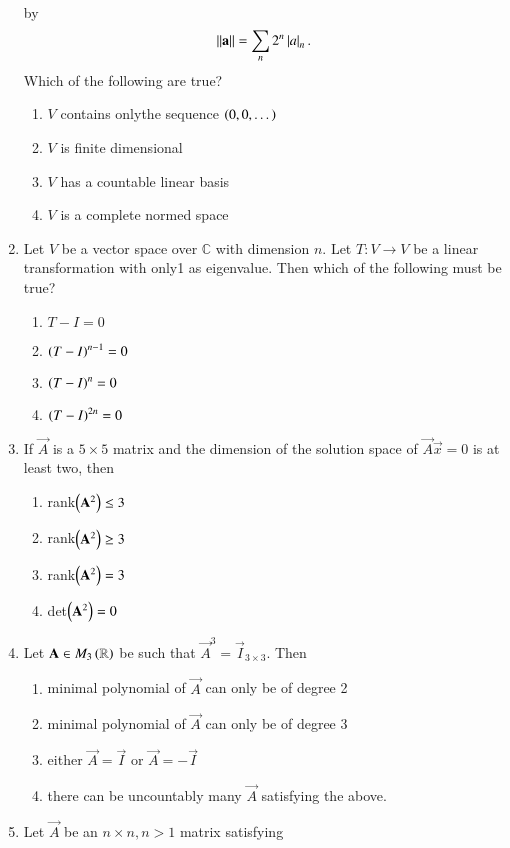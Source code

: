 \begin{enumerate}[label=\thesection.\arabic*.,ref=\thesection.\theenumi]
\begin{align}
\end{align}
by
\begin{align}
\left\lVert\mathbf{a}\right\rVert = \sum_{n}2^n\left\vert a\right\vert_n.
\end{align}
%
Which of the following are true?
\begin{enumerate}
\item $V$ contains onlythe sequence $\left(0,0,\dots\right)$
\item $V$ is finite dimensional
\item $V$ has a countable linear basis
\item $V$ is a complete normed space
\end{enumerate}
%
\item Let $V$ be a vector space over $\mathbb{C}$ with dimension $n$.  Let $T:V\to V$ be a linear transformation with
only1 as eigenvalue.  Then which of the following must be true?
\begin{enumerate}
\item $T-I = 0$ 
\item $\left(T-I\right)^{n-1} = 0$ 
\item $\left(T-I\right)^{n} = 0$ 
\item $\left(T-I\right)^{2n} = 0$ 
\end{enumerate}
%
\item If $\vec{A}$ is a $5\times 5$ matrix and the dimension of the solution space of $\vec{A}\vec{x} = 0$ is at least two, then
\begin{enumerate}
\item rank$\left(\mathbf{A}^2\right) \le 3$ 
\item rank$\left(\mathbf{A}^2\right) \ge 3$ 
\item rank$\left(\mathbf{A}^2\right) = 3$ 
\item det$\left(\mathbf{A}^2\right) = 0$ 
\end{enumerate}
%
\item Let $\mathbf{A} \in M_3\left(\mathbb{R}\right)$ be such that $\vec{A}^3 = \vec{I}_{3\times 3}$.  Then
\begin{enumerate}
\item minimal polynomial of $\vec{A}$ can only be of degree 2
\item minimal polynomial of $\vec{A}$ can only be of degree 3
\item either $\vec{A} = \vec{I}$ or $\vec{A} = -\vec{I}$
\item there can be uncountably many $\vec{A}$ satisfying the above.
\end{enumerate}
%
%
\solution

\item Let $\vec{A}$ be an $n \times n, n > 1$ matrix satisfying

\end{enumerate}
